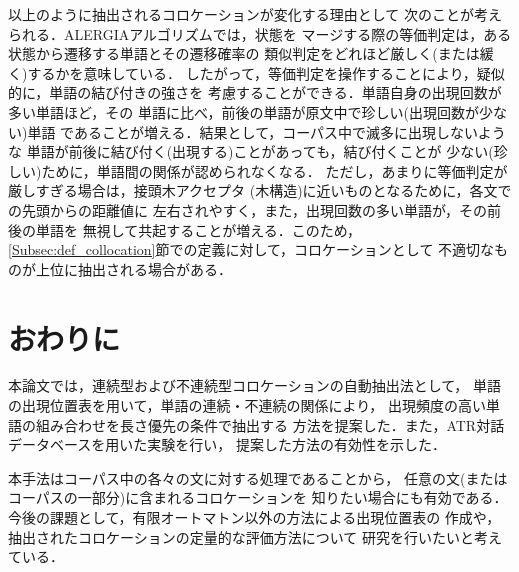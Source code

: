 以上のように抽出されるコロケーションが変化する理由として
次のことが考えられる．ALERGIAアルゴリズムでは，状態を
マージする際の等価判定は，ある状態から遷移する単語とその遷移確率の
類似判定をどれほど厳しく(または緩く)するかを意味している．
したがって，等価判定を操作することにより，疑似的に，単語の結び付きの強さを
考慮することができる．単語自身の出現回数が多い単語ほど，その
単語に比べ，前後の単語が原文中で珍しい(出現回数が少ない)単語
であることが増える．結果として，コーパス中で滅多に出現しないような
単語が前後に結び付く(出現する)ことがあっても，結び付くことが
少ない(珍しい)ために，単語間の関係が認められなくなる．
ただし，あまりに等価判定が厳しすぎる場合は，接頭木アクセプタ
(木構造)に近いものとなるために，各文での先頭からの距離値に
左右されやすく，また，出現回数の多い単語が，その前後の単語を
無視して共起することが増える．このため，
\ref{Subsec:def_collocation}節での定義に対して，コロケーションとして
不適切なものが上位に抽出される場合がある．

\section{おわりに}
\label{Sec:conclusion}

本論文では，連続型および不連続型コロケーションの自動抽出法として，
単語の出現位置表を用いて，単語の連続・不連続の関係により，
出現頻度の高い単語の組み合わせを長さ優先の条件で抽出する
方法を提案した．また，ATR対話データベースを用いた実験を行い，
提案した方法の有効性を示した．

本手法はコーパス中の各々の文に対する処理であることから，
任意の文(またはコーパスの一部分)に含まれるコロケーションを
知りたい場合にも有効である．
今後の課題として，有限オートマトン以外の方法による出現位置表の
作成や，抽出されたコロケーションの定量的な評価方法について
研究を行いたいと考えている．






\begin{biography}


\end{biography}



